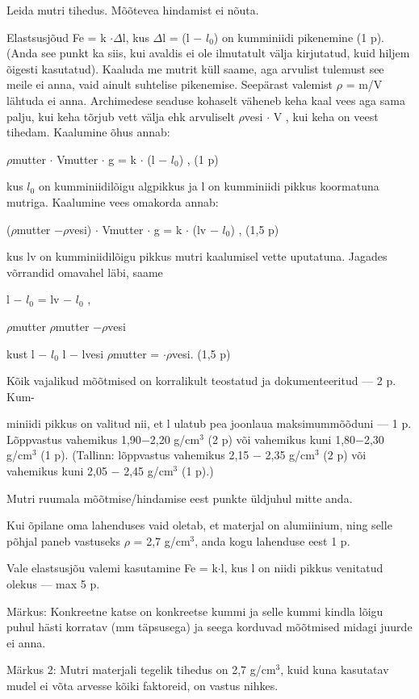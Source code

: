 
Leida mutri tihedus. Mõõtevea hindamist ei nõuta.

\hint

\solu
Elastsusjõud Fe = k $\cdot \Delta$l, kus $\Delta$l = (l $-$ $l_0$) on kumminiidi pikenemine (1 p). (Anda see punkt ka siis, kui avaldis ei ole ilmutatult välja kirjutatud, kuid hiljem õigesti kasutatud). Kaaluda me mutrit küll saame, aga arvulist tulemust see meile ei anna, vaid ainult suhtelise pikenemise. Seepärast valemist $\rho$ = m/V lähtuda ei anna. Archimedese seaduse kohaselt väheneb keha kaal vees aga sama palju, kui keha tõrjub vett välja ehk arvuliselt $\rho$vesi $\cdot$ V , kui keha on veest tihedam. Kaalumine õhus annab:

$\rho$mutter $\cdot$ Vmutter $\cdot$ g = k $\cdot$ (l $-$ $l_0$) , (1 p)

kus $l_0$ on kumminiidilõigu algpikkus ja l on kumminiidi pikkus koormatuna mutriga. Kaalumine vees omakorda annab:

($\rho$mutter $- \rho$vesi) $\cdot$ Vmutter $\cdot$ g = k $\cdot$ (lv $-$ $l_0$) , (1,5 p)

kus lv on kumminiidilõigu pikkus mutri kaalumisel vette uputatuna. Jagades võrrandid omavahel läbi, saame

l $-$ $l_0$ = lv $-$ $l_0$ ,

$\rho$mutter $\rho$mutter $- \rho$vesi

kust l $-$ $l_0$ l $-$ lvesi $\rho$mutter = $\cdot \rho$vesi. (1,5 p)

Kõik vajalikud mõõtmised on korralikult teostatud ja dokumenteeritud --- 2 p. Kum-

miniidi pikkus on valitud nii, et l ulatub pea joonlaua maksimummõõduni --- 1 p. Lõppvastus vahemikus 1,90$-$2,20 g/cm$^3$ (2 p) või vahemikus kuni 1,80$-$2,30 g/cm$^3$ (1 p). (Tallinn: lõppvastus vahemikus 2,15 $-$ 2,35 g/cm$^3$ (2 p) või vahemikus kuni 2,05 $-$ 2,45 g/cm$^3$ (1 p).)

Mutri ruumala mõõtmise/hindamise eest punkte üldjuhul mitte anda.

Kui õpilane oma lahenduses vaid oletab, et materjal on alumiinium, ning selle põhjal paneb vastuseks $\rho$ = 2,7 g/cm$^3$, anda kogu lahenduse eest 1 p.

Vale elastsusjõu valemi kasutamine Fe = k$\cdot$l, kus l on niidi pikkus venitatud olekus --- max 5 p.

Märkus: Konkreetne katse on konkreetse kummi ja selle kummi kindla lõigu puhul hästi korratav (mm täpsusega) ja seega korduvad mõõtmised midagi juurde ei anna.

Märkus 2: Mutri materjali tegelik tihedus on 2,7 g/cm$^3$, kuid kuna kasutatav mudel ei võta arvesse kõiki faktoreid, on vastus nihkes.
\probend
